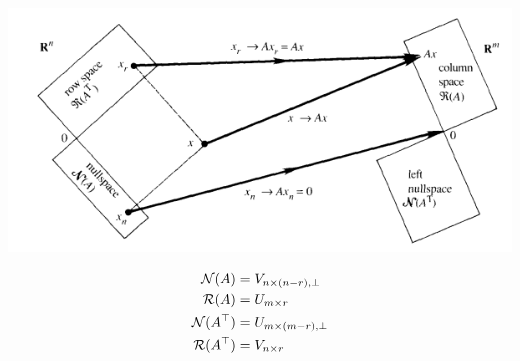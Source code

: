 \documentclass[times,t]{beamer}
\begin{document}
\begin{frame}

  \begin{center}
  \includegraphics[width=0.5\linewidth]{./media/four-fundamental-subspaces.png}
  \end{center}
  \begin{align*}
    {\cal N}(A) &= V_{n\times (n-r),\perp}
               \\
    {\cal R}(A) &= U_{m\times r}
    \\
    {\cal N}(A^\top) &= U_{m\times (m-r),\perp}
    \\
    {\cal R}(A^\top) &= V_{n\times r}
    \end{align*}
\end{frame}
\end{document}
